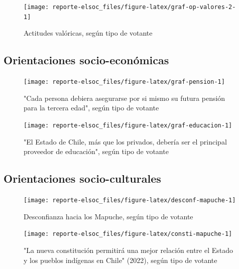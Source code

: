 \documentclass[
  12pt,
]{book}
\begin{document}
\begin{figure}

{\centering \texttt{[image: reporte-elsoc\_files/figure-latex/graf-op-valores-2-1]} 

}

\caption{Actitudes valóricas, según tipo de votante}\label{fig:graf-op-valores-2}
\end{figure}

\hypertarget{orientaciones-socio-econuxf3micas}{%
\subsection{Orientaciones socio-económicas}\label{orientaciones-socio-econuxf3micas}}

\begin{figure}

{\centering \texttt{[image: reporte-elsoc\_files/figure-latex/graf-pension-1]} 

}

\caption{"Cada persona debiera asegurarse por si mismo su futura pensión para la tercera edad", según tipo de votante}\label{fig:graf-pension}
\end{figure}

\begin{figure}

{\centering \texttt{[image: reporte-elsoc\_files/figure-latex/graf-educacion-1]} 

}

\caption{"El Estado de Chile, más que los privados, debería ser el principal proveedor de educación", según tipo de votante}\label{fig:graf-educacion}
\end{figure}

\hypertarget{orientaciones-socio-culturales}{%
\subsection{Orientaciones socio-culturales}\label{orientaciones-socio-culturales}}

\begin{figure}

{\centering \texttt{[image: reporte-elsoc\_files/figure-latex/desconf-mapuche-1]} 

}

\caption{Desconfianza hacia los Mapuche, según tipo de votante}\label{fig:desconf-mapuche}
\end{figure}

\begin{figure}

{\centering \texttt{[image: reporte-elsoc\_files/figure-latex/consti-mapuche-1]} 

}

\caption{"La nueva constitución permitirá una mejor relación entre el Estado y los pueblos indígenas en Chile" (2022), según tipo de votante}\label{fig:consti-mapuche}
\end{figure}
\end{document}
